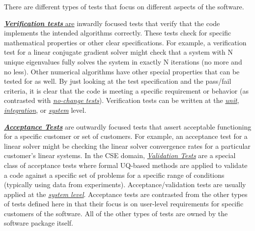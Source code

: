 \documentclass[]{article}
\begin{document}
There are different types of tests that focus on different aspects of
the software.

\protect\hypertarget{id.ew32p2pvdumb}{}{}\href{http://en.wikipedia.org/wiki/Verification_and_validation}{\textbf{\emph{Verification
tests}} are} inwardly focused tests that verify that the code implements
the intended algorithms correctly. These tests check for specific
mathematical properties or other clear specifications. For example, a
verification test for a linear conjugate gradient solver might check
that a system with N unique eigenvalues fully solves the system in
exactly N iterations (no more and no less). Other numerical algorithms
have other special properties that can be tested for as well. By just
looking at the test specification and the pass/fail criteria, it is
clear that the code is meeting a specific requirement or behavior (as
contrasted with \protect\hyperlink{id.h6jkn7ujujea}{\emph{no-change
tests}}). Verification tests can be written at the
\protect\hyperlink{id.5saje75168fl}{\emph{unit}},
\protect\hyperlink{id.j931ebv6xsmb}{\emph{integration}}, or
\protect\hyperlink{id.vllu2z1lvhtb}{\emph{system}} level.

\protect\hypertarget{id.vshb6z6grels}{}{}\href{http://en.wikipedia.org/wiki/Acceptance_testing}{\textbf{\emph{Acceptance
Tests}}} are outwardly focused tests that assert acceptable functioning
for a specific customer or set of customers. For example, an acceptance
test for a linear solver might be checking the linear solver convergence
rates for a particular customer's linear systems. In the CSE domain,
\href{http://www.google.com/url?q=http\%3A\%2F\%2Fen.wikipedia.org\%2Fwiki\%2FVerification_and_validation\&sa=D\&sntz=1\&usg=AFQjCNGgv47JBnoOgKa8RhxYOeC2ln3JAA}{\emph{Validation
Tests}} are a special class of acceptance tests where formal UQ-based
methods are applied to validate a code against a specific set of
problems for a specific range of conditions (typically using data from
experiments). Acceptance/validation tests are usually applied at the
\protect\hyperlink{id.vllu2z1lvhtb}{\emph{system level}}. Acceptance
tests are contrasted from the other types of tests defined here in that
their focus is on user-level requirements for specific customers of the
software. All of the other types of tests are owned by the software
package itself.
\end{document}
